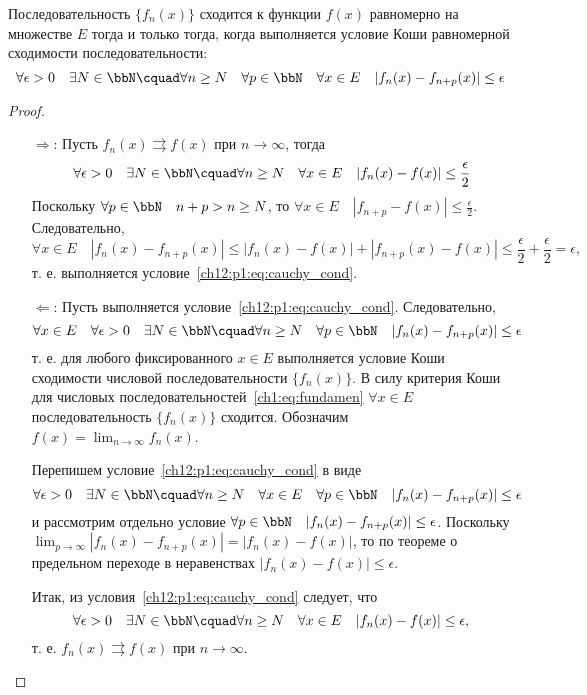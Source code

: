 \begin{thm}
	\label{ch12:th:cauchy_criteria}
	Последовательность $\{f_n(x)\}$ сходится к функции $f(x)$ равномерно на множестве $E$
	тогда и только тогда, когда выполняется условие Коши равномерной сходимости последовательности:
	\begin{equation}
		\label{ch12:p1:eq:cauchy_cond}
		\forall \epsilon > 0 \quad \exists N \in \bbN \cquad
			\forall n \ge N \quad \forall p \in \bbN \quad \forall x \in E \quad
			|f_n(x) - f_{n+p}(x)| \le \epsilon
	\end{equation}
\end{thm}
\begin{proof}\leavevmode
\begin{itemize}[wide, labelwidth=!, labelindent=0pt]
	\item[$\Longrightarrow$:]
	Пусть $f_n(x) \rightrightarrows f(x)$ при $n \to \infty$, тогда 
	$$
		\forall \epsilon > 0 \quad \exists N \in \bbN \cquad
			\forall n \ge N \quad \forall x \in E \quad |f_n(x) - f(x)| \le \frac{\epsilon}{2}
	$$
	Поскольку $\forall p \in \bbN \quad n + p > n \ge N$, то
	$\forall x \in E \quad |f_{n+p} - f(x)| \le \frac{\epsilon}{2}$.\\
	Следовательно,
	$$
		\forall x \in E \quad |f_n(x) - f_{n+p}(x)| \le |f_n(x) - f(x)| + |f_{n+p}(x) - f(x)| \le
			\frac{\epsilon}{2} + \frac{\epsilon}{2} = \epsilon,
	$$
	т. е. выполняется условие~\eqref{ch12:p1:eq:cauchy_cond}.

	\item[$\Longleftarrow$:]
	Пусть выполняется условие~\eqref{ch12:p1:eq:cauchy_cond}. Следовательно,
	$$
		\forall x \in E \quad \forall \epsilon > 0 \quad \exists N \in \bbN \cquad
			\forall n \ge N \quad \forall p \in \bbN \quad
			|f_n(x) - f_{n+p}(x)| \le \epsilon
	$$
	т. е. для любого фиксированного $x \in E$ выполняется условие Коши сходимости
	числовой последовательности $\{f_n(x)\}$. В силу критерия Коши для числовых
	последовательностей~\eqref{ch1:eq:fundamen} $\forall x \in E$
	последовательность $\{f_n(x)\}$ сходится.
	Обозначим $f(x) = \lim_{n \to \infty}\limits f_n(x)$.

	Перепишем условие~\eqref{ch12:p1:eq:cauchy_cond} в виде
	$$
		\forall \epsilon > 0 \quad \exists N \in \bbN \cquad
			\forall n \ge N \quad \forall x \in E \quad \forall p \in \bbN \quad 
			|f_n(x) - f_{n+p}(x)| \le \epsilon
	$$
	и рассмотрим отдельно условие $\forall p \in \bbN \quad |f_n(x) - f_{n+p}(x)| \le \epsilon$.
	Поскольку $\lim_{p \to \infty}\limits |f_n(x) - f_{n+p}(x)| = |f_n(x) - f(x)|$, то
	по теореме о предельном переходе в неравенствах $|f_n(x) - f(x)| \le \epsilon$.

	Итак, из условия~\eqref{ch12:p1:eq:cauchy_cond} следует, что
	$$
		\forall \epsilon > 0 \quad \exists N \in \bbN \cquad
			\forall n \ge N \quad \forall x \in E \quad |f_n(x) - f(x)| \le \epsilon,
	$$
	т. е. $f_n(x) \rightrightarrows f(x)$ при $n \to \infty$.
\end{itemize}
\end{proof}


